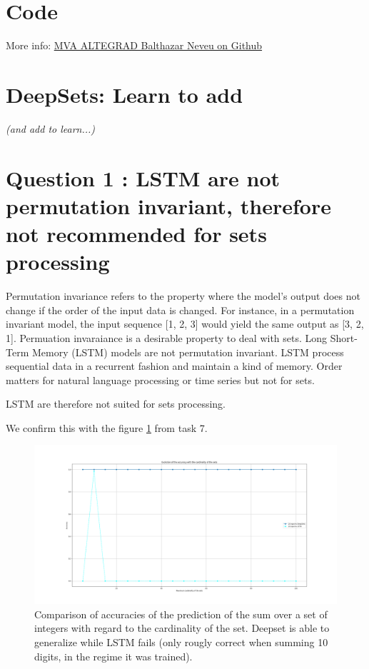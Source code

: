 \documentclass[a4paper]{article}
\begin{document}

\section*{Code}

More info:
\href{https://github.com/balthazarneveu/MVA23_ALTEGRAD/#readme}{MVA ALTEGRAD Balthazar Neveu on Github}

\section{DeepSets: Learn to add}
\textit{(and add to learn...)}
\section*{Question 1 : LSTM are not permutation invariant, therefore not recommended for sets processing}
Permutation invariance refers to the property where the model's output does not change if the order of the input data is changed. For instance, in a permutation invariant model, the input sequence [1, 2, 3] would yield the same output as [3, 2, 1]. Permuation invaraiance is a desirable property to deal with sets.
\newline
Long Short-Term Memory (LSTM) models are not permutation invariant. LSTM process sequential data in a recurrent fashion and maintain a kind of memory. Order matters for natural language processing or time series but not for sets. 

LSTM are therefore not suited for sets processing.
\newline



We confirm this with the figure \ref{fig:performances_deepset_lstm} from task 7.

\begin{figure}[h]
    \centering
    \includegraphics[width=1.\textwidth]{figures/deep_set_performances.png}
    \caption{Comparison of accuracies of the prediction of the sum over a set of integers with regard to the cardinality of the set. Deepset is able to generalize while LSTM fails (only rougly correct when summing 10 digits, in the regime it was trained).}
    \label{fig:performances_deepset_lstm}
\end{figure}
\end{document}
